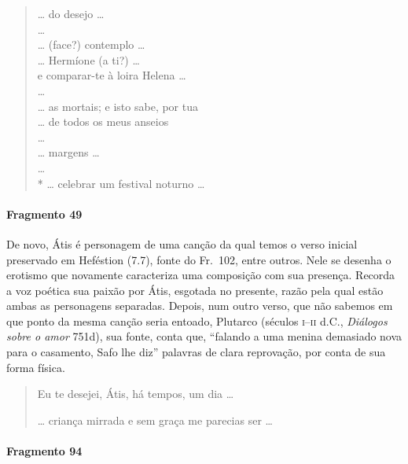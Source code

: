 \begin{verse}
\ldots{} do desejo \ldots{}\\
\ldots{}\\
\ldots{} (face?) contemplo \ldots{}\\
\ldots{} Hermíone (a ti?) \ldots{}\\
e comparar-te à loira Helena \ldots{}\\
\ldots{}\\
\ldots{} as mortais; e isto sabe, por tua\\
\ldots{} de todos os meus anseios\\
\ldots{}\\
\ldots{} margens \ldots{}\\
\ldots{}\\*
\ldots{} celebrar um festival noturno \ldots{} 
\end{verse}

\paragraph{Fragmento 49}

{\small De novo, Átis é personagem de uma canção da qual temos o verso inicial preservado em Heféstion (7.7), fonte do Fr.~102, entre outros. Nele se desenha o erotismo que novamente caracteriza uma composição com sua presença. Recorda a voz poética sua paixão por Átis, esgotada no presente, razão pela qual estão ambas as personagens separadas. Depois, num outro verso, que não sabemos em que ponto da mesma canção seria entoado, Plutarco (séculos \textsc{i}--\textsc{ii} d.C., \textit{Diálogos sobre o amor} 751d),
sua fonte, conta que, “falando a uma menina demasiado nova para o
casamento, Safo lhe diz” palavras de clara reprovação, por conta de sua forma
física. }

\begin{verse}
Eu te desejei, Átis, há tempos, um dia \ldots{}

\ast\quad\ast\quad\ast

\ldots{} criança mirrada e sem graça me parecias ser \ldots{}
\end{verse}


\paragraph{Fragmento 94}

